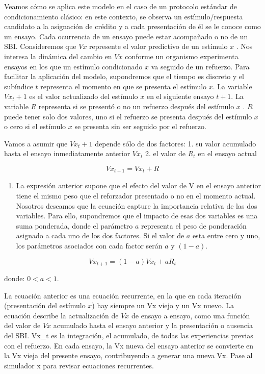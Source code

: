 \documentclass[
  letterpaper,
]{book}
\providecommand{\tightlist}{%
  \setlength{\itemsep}{0pt}\setlength{\parskip}{0pt}}\usepackage{longtable,booktabs,array}
\begin{document}
Veamos cómo se aplica este modelo en el caso de un protocolo estándar de
condicionamiento clásico: en este contexto, se observa un
estímulo/respuesta candidato a la asignación de crédito y a cada
presentación de él se le conoce como un ensayo. Cada ocurrencia de un
ensayo puede estar acompañado o no de un SBI. Consideremos que \(Vx\)
represente el valor predictivo de un estímulo \(x\) . Nos interesa la
dinámica del cambio en \(Vx\) conforme un organismo experimenta ensayos
en los que un estímulo condicionado \(x\) va seguido de un refuerzo.
Para facilitar la aplicación del modelo, supondremos que el tiempo es
discreto y el subíndice \(t\) representa el momento en que se presenta
el estímulo \(x\). La variable \(Vx_t+1\) es el valor actualizado del
estímulo \(x\) en el siguiente ensayo \(t+1\). La variable \(R\)
representa si se presentó o no un refuerzo después del estímulo \(x\) .
\(R\) puede tener solo dos valores, uno si el refuerzo se presenta
después del estímulo \(x\) o cero si el estímulo \(x\) se presenta sin
ser seguido por el refuerzo.

Vamos a asumir que \(Vx_t+1\) depende sólo de dos factores: 1. su valor
acumulado hasta el ensayo inmediatamente anterior \(Vx_t\) 2. el valor
de \(R_t\) en el ensayo actual

\[
Vx_{t+1} = Vx_t + R
\]

\begin{enumerate}
\def\labelenumi{\arabic{enumi}.}
\setcounter{enumi}{2}
\tightlist
\item
  La expresión anterior supone que el efecto del valor de V en el ensayo
  anterior tiene el mismo peso que el reforzador presentado o no en el
  momento actual. Nosotros deseamos que la ecuación capture la
  importancia relativa de las dos variables. Para ello, supondremos que
  el impacto de esas dos variables es una suma ponderada, donde el
  parámetro \(a\) representa el peso de ponderación asignado a cada uno
  de los dos factores. Si el valor de \(a\) esta entre cero y uno, los
  parámetros asociados con cada factor serán \(a\) y \((1-a)\).
\end{enumerate}

\[
Vx_{t+1} = (1-a)Vx_t + aR_t
\]

donde: \(0 < a < 1\).

La ecuación anterior es una ecuación recurrente, en la que en cada
iteración (presentación del estímulo \(x\)) hay siempre un Vx viejo y un
Vx nuevo. La ecuación describe la actualización de \(Vx\) de ensayo a
ensayo, como una función del valor de \(Vx\) acumulado hasta el ensayo
anterior y la presentación o ausencia del SBI. Vx\_t es la integración,
el acumulado, de todas las experiencias previas con el refuerzo. En cada
ensayo, la Vx nueva del ensayo anterior se convierte en la Vx vieja del
presente ensayo, contribuyendo a generar una nueva Vx. Pase al simulador
x para revisar ecuaciones recurrentes.
\end{document}
